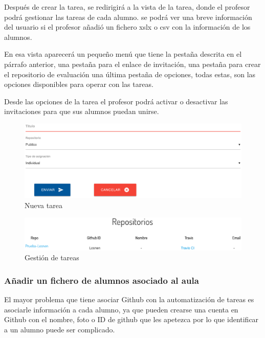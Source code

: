 Después de crear la tarea, se redirigirá a la vista de la tarea, donde el profesor podrá gestionar las tareas de cada alumno. se podrá ver una breve información del usuario si el profesor añadió un fichero xslx o csv con la información de los alumnos.

En esa vista aparecerá un pequeño menú que tiene la pestaña descrita en el párrafo anterior, una pestaña para el enlace de invitación, una pestaña para crear el repositorio de evaluación una última pestaña de opciones, todas estas, son las opciones disponibles para operar con las tareas.

Desde las opciones de la tarea el profesor podrá activar o desactivar las invitaciones para que sus alumnos puedan unirse.

\begin{figure}[!th]
\begin{center}
\includegraphics[scale=0.5]{images/tarea}
\caption{Nueva tarea}
\label{fig:Nueva tarea}
\end{center}
\end{figure}

\begin{figure}[!th]
\begin{center}
\includegraphics[scale=0.5]{images/gestion}
\caption{Gestión de tareas}
\label{fig:Gestion de tareas}
\end{center}
\end{figure}

\newpage

\subsubsection{Añadir un fichero de alumnos asociado al aula}

El mayor problema que tiene asociar Github con la automatización de tareas es asociarle información a cada alumno, ya que pueden crearse una cuenta en Github con el nombre, foto o ID de github que les apetezca 
por lo que identificar a un alumno puede ser complicado. 

